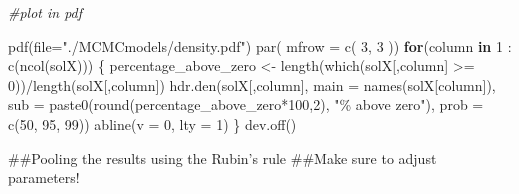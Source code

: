 \documentclass[
]{article}
\newenvironment{Shaded}{\begin{snugshade}}{\end{snugshade}}
\newcommand{\AttributeTok}[1]{\textcolor[rgb]{0.77,0.63,0.00}{#1}}
\newcommand{\CommentTok}[1]{\textcolor[rgb]{0.56,0.35,0.01}{\textit{#1}}}
\newcommand{\ControlFlowTok}[1]{\textcolor[rgb]{0.13,0.29,0.53}{\textbf{#1}}}
\newcommand{\DecValTok}[1]{\textcolor[rgb]{0.00,0.00,0.81}{#1}}
\newcommand{\FunctionTok}[1]{\textcolor[rgb]{0.00,0.00,0.00}{#1}}
\newcommand{\NormalTok}[1]{#1}
\newcommand{\OtherTok}[1]{\textcolor[rgb]{0.56,0.35,0.01}{#1}}
\newcommand{\SpecialCharTok}[1]{\textcolor[rgb]{0.00,0.00,0.00}{#1}}
\newcommand{\StringTok}[1]{\textcolor[rgb]{0.31,0.60,0.02}{#1}}
\begin{document}
\begin{Shaded}
\begin{Highlighting}[]
\CommentTok{\#plot in pdf}


\FunctionTok{pdf}\NormalTok{(}\AttributeTok{file=}\StringTok{"./MCMCmodels/density.pdf"}\NormalTok{)}
\FunctionTok{par}\NormalTok{( }\AttributeTok{mfrow =} \FunctionTok{c}\NormalTok{( }\DecValTok{3}\NormalTok{, }\DecValTok{3}\NormalTok{ ))}
    \ControlFlowTok{for}\NormalTok{(column }\ControlFlowTok{in} \DecValTok{1} \SpecialCharTok{:} \FunctionTok{c}\NormalTok{(}\FunctionTok{ncol}\NormalTok{(solX))) \{}
\NormalTok{    percentage\_above\_zero }\OtherTok{\textless{}{-}} \FunctionTok{length}\NormalTok{(}\FunctionTok{which}\NormalTok{(solX[,column] }\SpecialCharTok{\textgreater{}=} \DecValTok{0}\NormalTok{))}\SpecialCharTok{/}\FunctionTok{length}\NormalTok{(solX[,column])}
\FunctionTok{hdr.den}\NormalTok{(solX[,column],  }\AttributeTok{main =} \FunctionTok{names}\NormalTok{(solX[column]), }\AttributeTok{sub =} \FunctionTok{paste0}\NormalTok{(}\FunctionTok{round}\NormalTok{(percentage\_above\_zero}\SpecialCharTok{*}\DecValTok{100}\NormalTok{,}\DecValTok{2}\NormalTok{), }\StringTok{"\% above zero"}\NormalTok{), }\AttributeTok{prob =} \FunctionTok{c}\NormalTok{(}\DecValTok{50}\NormalTok{, }\DecValTok{95}\NormalTok{, }\DecValTok{99}\NormalTok{))}
\FunctionTok{abline}\NormalTok{(}\AttributeTok{v =} \DecValTok{0}\NormalTok{, }\AttributeTok{lty =} \DecValTok{1}\NormalTok{)  }
\NormalTok{    \}}
\FunctionTok{dev.off}\NormalTok{()}
\end{Highlighting}
\end{Shaded}

\#\#Pooling the results using the Rubin's rule \#\#Make sure to adjust
parameters!
\end{document}
